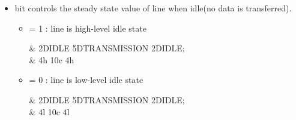 \documentclass{article}
\begin{document}
\begin{itemize}
	\item {} bit controls the steady state value of  line when idle(no data is transferred).
	\begin{itemize}
		\item {} = 1 :  line is high-level idle state
		\begin{center}
			\begin{tikztimingtable}[%
				timing/dslope=0.1,
				timing/.style={x=5ex,y=2ex},
				x=5ex,
				timing/rowdist=3ex,
				timing/name/.style={font=\sffamily\scriptsize}
				]
				 & 2D{IDLE} 5D{TRANSMISSION} 2D{IDLE};\\
				         & 4{h} 10{c} 4{h}\\				
			\end{tikztimingtable}
		\end{center}
			
		\item {}  = 0 :  line is low-level idle state
		\begin{center}
			\begin{tikztimingtable}[%
				timing/dslope=0.1,
				timing/.style={x=5ex,y=2ex},
				x=5ex,
				timing/rowdist=3ex,
				timing/name/.style={font=\sffamily\scriptsize}
				]
				 & 2D{IDLE} 5D{TRANSMISSION} 2D{IDLE};\\
				         & 4{l} 10{c} 4{l}\\				
			\end{tikztimingtable}
		\end{center}
	\end{itemize}


\end{itemize}
\end{document}
